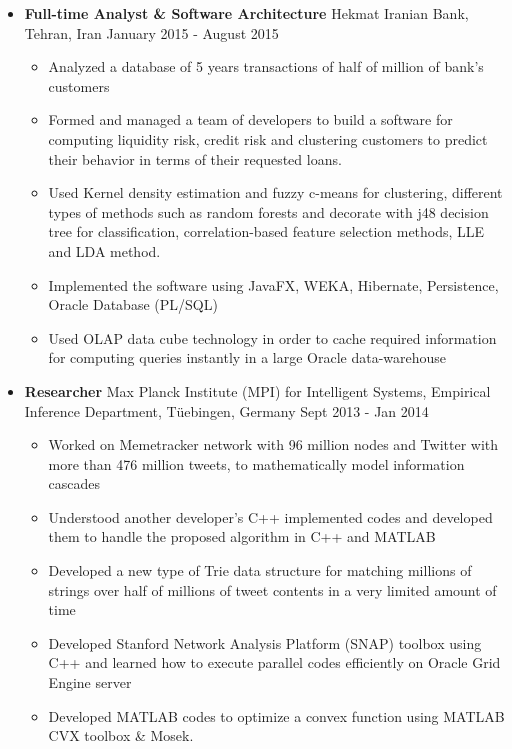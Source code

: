 \documentclass[letter]{res}
\begin{document}
\begin{resume}
\begin{itemize}[leftmargin=-.1in]
			\item \textbf{Full-time Analyst \& Software Architecture} \newline
			Hekmat Iranian Bank, Tehran, Iran \hfill January 2015 - August 2015\\
			\vspace{-4mm}
			\iflong
			\begin{itemize}
				\item Analyzed a database of 5 years transactions of half of million of bank's customers
				\item Formed and managed a team of developers to build a software for computing liquidity risk, credit risk and clustering customers to predict their behavior in terms of their requested loans. 
				\item Used Kernel density estimation and fuzzy c-means for clustering, different types of methods such as random forests and decorate with j48 decision tree for classification, correlation-based feature selection methods, LLE and LDA method.
				\item Implemented the software using JavaFX, WEKA, Hibernate, Persistence, Oracle Database (PL/SQL)
				\item Used OLAP data cube technology in order to cache required information for computing queries instantly in a large Oracle data-warehouse
			\end{itemize}
			\fi
			
			\item \textbf{Researcher} \newline
			Max Planck Institute (MPI) for Intelligent Systems, Empirical Inference Department, Tüebingen, Germany \hfill {\footnotesize Sept 2013 - Jan 2014}\\
			\vspace{-4mm}
			\iflong
			\begin{itemize}
				\item Worked on Memetracker network with 96 million nodes and Twitter with more than 476 million tweets, to mathematically model information cascades
				\item Understood another developer's C++ implemented codes and developed them to handle the proposed algorithm in C++ and MATLAB
				\item Developed a new type of Trie data structure for matching millions of strings over half of millions of tweet contents in a very limited amount of time
				\item Developed Stanford Network Analysis Platform (SNAP) toolbox using C++ and learned how to execute parallel codes efficiently on Oracle Grid Engine server
				\item Developed MATLAB codes to optimize a convex function using MATLAB CVX toolbox \& Mosek.
			\end{itemize}
			\fi
			

\end{itemize}
\end{resume}
\end{document}
